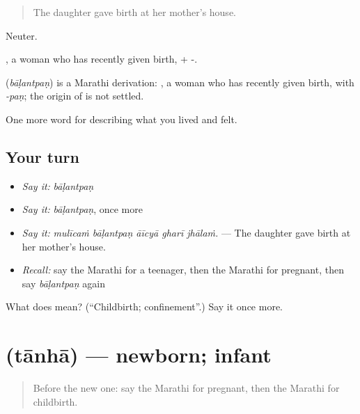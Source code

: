 \begin{quote}
The daughter gave birth at her mother's house.
\end{quote}

Neuter.

, a woman who has recently given birth, + -.

\begin{cousinweb}
\textbf{} (\emph{bāḷantpaṇ}) is a Marathi derivation: , a woman who has recently given birth, with \emph{-paṇ}; the origin of  is not settled.
\end{cousinweb}

\begin{grammarlens}[title={What you've built}]
One more word for describing what you lived and felt.
\end{grammarlens}

\subsection*{Your turn}
\begin{itemize}
\raggedright
  \item \emph{Say it:} \emph{bāḷantpaṇ}
  \item \emph{Say it:} \emph{bāḷantpaṇ}, once more
  \item \emph{Say it:} \emph{mulīcaṁ bāḷantpaṇ āīcyā gharī jhālaṁ.} — The daughter gave birth at her mother's house.
  \item \emph{Recall:} say the Marathi for a teenager, then the Marathi for pregnant, then say \emph{bāḷantpaṇ} again
\end{itemize}

\begin{tcolorbox}[breakable,colback=teal!4,colframe=teal!35!black,title={Before you move on}]
What does  mean? (\textquotedblleft{}Childbirth; confinement\textquotedblright{}.) Say it once more.
\end{tcolorbox}
\section[\texorpdfstring{\mr{तान्हा} (tānhā)}{तान्हा (tānhā)}]{ (tānhā) — newborn; infant}

\label{lesson:MR-C499-tanha}



\begin{quote}
Before the new one: say the Marathi for pregnant, then the Marathi for childbirth.
\end{quote}

